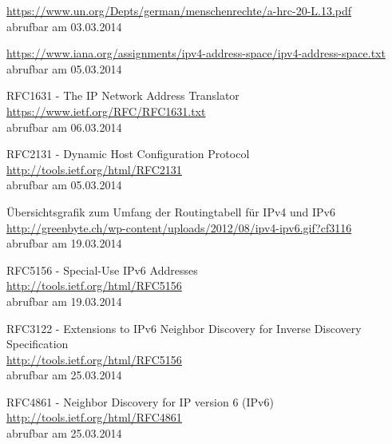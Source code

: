 \documentclass[a4paper,12pt]{scrartcl}
\begin{document}
\begin{thebibliography}{50}

\url{https://www.un.org/Depts/german/menschenrechte/a-hrc-20-L.13.pdf}\\
abrufbar am 03.03.2014

 \url{https://www.iana.org/assignments/ipv4-address-space/ipv4-address-space.txt}\\
abrufbar am 05.03.2014

 RFC1631 - The IP Network Address Translator\\
\url{https://www.ietf.org/RFC/RFC1631.txt}\\
abrufbar am 06.03.2014

 RFC2131 - Dynamic Host Configuration Protocol\\
\url{http://tools.ietf.org/html/RFC2131}\\
abrufbar am 05.03.2014

 \"Ubersichtsgrafik zum Umfang der Routingtabell f\"ur IPv4 und IPv6\\
\url{http://greenbyte.ch/wp-content/uploads/2012/08/ipv4-ipv6.gif?cf3116}\\
abrufbar am 19.03.2014

 RFC5156 - Special-Use IPv6 Addresses \\
\url{http://tools.ietf.org/html/RFC5156}\\
abrufbar am 19.03.2014

 RFC3122 -  Extensions to IPv6 Neighbor Discovery for Inverse Discovery Specification\\
\url{http://tools.ietf.org/html/RFC5156}\\
abrufbar am 25.03.2014

 RFC4861 - Neighbor Discovery for IP version 6 (IPv6) \\
\url{http://tools.ietf.org/html/RFC4861}\\
abrufbar am 25.03.2014

\end{thebibliography}
 
 
\end{document}

